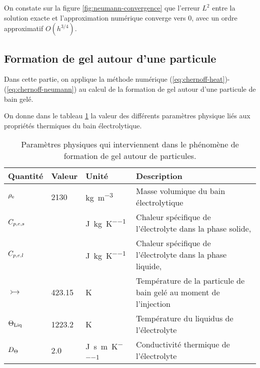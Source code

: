 On constate sur la figure \ref{fig:neumann-convergence} que l'erreur
$L^2$ entre la solution exacte et l'approximation numérique converge
vers 0, avec un ordre approximatif $O(h^{3/4})$.




\subsection*{Formation de gel autour d'une particule}
Dans cette partie, on applique la méthode numérique
(\ref{eq:chernoff-heat})-(\ref{eq:chernoff-neumann}) au calcul de
la formation de gel autour d'une particule de bain gelé.

On donne dans le tableau \ref{tab:freeze-physical-parameters} la
valeur des différents paramètres physique liés aux propriétés
thermiques du bain électrolytique.

\begin{table}
  \begin{center}
    \caption{Paramètres physiques qui interviennent dans le
      phénomène de formation de gel autour de particules.}
    \label{tab:freeze-physical-parameters}
  \begin{tabularx}{\textwidth}{@{}lllX@{}}
    \toprule
    Quantité          & Valeur     & Unité                           & Description \\
    \midrule
    $\rho_\mathrm{e}$         & \num{2130} & \si{\kg\per\cubic\meter}        & Masse volumique du bain électrolytique\\
    $C_{p,e,s}$ & \num{} & \si{\joule\per\kilo\gram\per\kelvin} & Chaleur spécifique de  l'électrolyte dans la phase solide,\\
    $C_{p,e,l}$ & \num{} & \si{\joule\per\kilo\gram\per\kelvin} & Chaleur spécifique de
    l'électrolyte dans la phase liquide,\\
    $\tinj$ & \num{423.15} & \si{\kelvin} & Température de la
    particule de bain gelé au moment de l'injection\\
    $\Theta_\text{Liq}$ & \num{1223.2} & \si{\kelvin} & Température du liquidus de
    l'électrolyte\\
    $D_\Theta$ & \num{2.0} & \si{\joule\per\second\per\meter\per\kelvin} & Conductivité thermique de l'électrolyte \\
    \bottomrule
  \end{tabularx}
\end{center}
\end{table}

